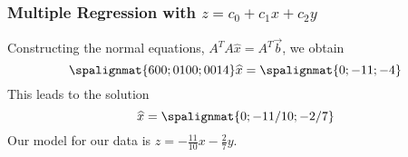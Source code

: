 \begin{frame}\frametitle{Multiple Regression with $z=c_0 + c_1x + c_2y$}
    
    \pause 
    Constructing the normal equations, $A^TA \widehat x = A^T \vec b$, we obtain
    \pause 
    $$\spalignmat{6 0 0;0 10 0;0 0 14}\widehat x = \spalignmat{0;-11;-4}$$
    \pause
    This leads to the solution $$\widehat x = \spalignmat{0;-11/10;-2/7}$$
    Our model for our data is $z = -\frac{11}{10}x - \frac27 y$. 
    
\end{frame}




